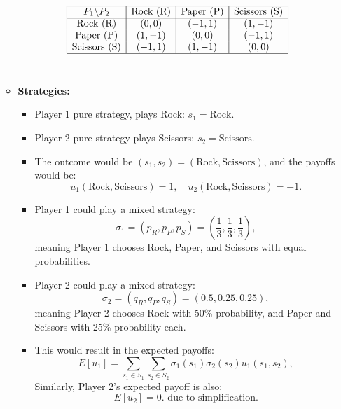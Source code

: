 \documentclass{article}
\begin{document}
\begin{itemize}
\begin{itemize}
        \[
        \begin{array}{|c|c|c|c|}
        \hline
        P_1 \backslash P_2 & \text{Rock (R)} & \text{Paper (P)} & \text{Scissors (S)} \\
        \hline
        \text{Rock (R)} & (0, 0) & (-1, 1) & (1, -1) \\
        \text{Paper (P)} & (1, -1) & (0, 0) & (-1, 1) \\
        \text{Scissors (S)} & (-1, 1) & (1, -1) & (0, 0) \\
        \hline
        \end{array}
        \]
        \\
        \item \textbf{Strategies:}
        \begin{itemize}
            \item Player 1 pure strategy, plays Rock: \( s_1 = \text{Rock} \).
            \item Player 2 pure strategy plays Scissors: \( s_2 = \text{Scissors} \).
            \item The outcome would be \( (s_1, s_2) = (\text{Rock}, \text{Scissors}) \), and the payoffs would be:
                \[
                u_1(\text{Rock}, \text{Scissors}) = 1, \quad u_2(\text{Rock}, \text{Scissors}) = -1.
                \]
            \item Player 1 could play a mixed strategy:
                \[
                \sigma_1 = (p_R, p_P, p_S) = \left(\frac{1}{3}, \frac{1}{3}, \frac{1}{3}\right),
                \]
            meaning Player 1 chooses Rock, Paper, and Scissors with equal probabilities.
            \item Player 2 could play a mixed strategy:
                \[
                \sigma_2 = (q_R, q_P, q_S) = \left(0.5, 0.25, 0.25\right),
                \]
            meaning Player 2 chooses Rock with 50\% probability, and Paper and Scissors with 25\% probability each.
            \item This would result in the expected payoffs: 
                \[
                    E[u_1] = \sum_{s_1 \in S_1} \sum_{s_2 \in S_2} \sigma_1(s_1) \sigma_2(s_2) u_1(s_1, s_2),
                \]
                Similarly, Player 2's expected payoff is also:
                \[
                E[u_2] = 0. \text{ due to simplification.}
                \]
        \end{itemize}
    \end{itemize}
\end{itemize}
\end{document}
